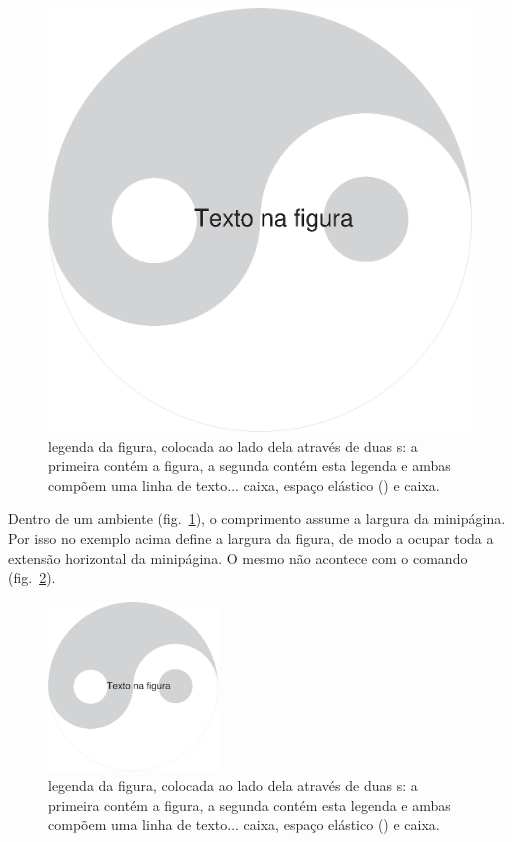\documentclass[a4paper,12pt]{article}
\begin{document}
	\begin{figure}
		\begin{minipage}[b]{0.4\textwidth}
			\includegraphics[width=\textwidth]{Tei-Gi}
		\end{minipage}\hfill
		\begin{minipage}[b]{0.5\textwidth}
			\caption{legenda da figura, colocada ao lado dela através de duas s: a primeira contém a figura, a segunda contém esta legenda e ambas compõem uma linha de texto... caixa, espaço elástico () e caixa.}
			\label{fig:minipage}
		\end{minipage}
	\end{figure}

	Dentro de um ambiente  (fig.~\ref{fig:minipage}), o comprimento  assume a largura da minipágina. Por isso no exemplo acima  define a largura da figura, de modo a ocupar toda a extensão horizontal da minipágina. O mesmo não acontece com o comando  (fig.~\ref{fig:parbox}).

	\begin{figure}
		\parbox[b]{0.4\textwidth}{\includegraphics[width=0.4\textwidth]{Tei-Gi}}%
		\hfill
		\parbox[b]{0.5\textwidth}{\caption{legenda da figura, colocada ao lado dela através de duas s: a primeira contém a figura, a segunda contém esta legenda e ambas compõem uma linha de texto... caixa, espaço elástico () e caixa.}
		\label{fig:parbox}}
	\end{figure}
\end{document}
